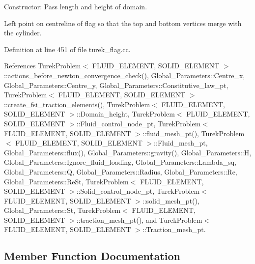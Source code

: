 Constructor\+: Pass length and height of domain. 

Left point on centreline of flag so that the top and bottom vertices merge with the cylinder. 

Definition at line 451 of file turek\+\_\+flag.\+cc.



References Turek\+Problem$<$ F\+L\+U\+I\+D\+\_\+\+E\+L\+E\+M\+E\+N\+T, S\+O\+L\+I\+D\+\_\+\+E\+L\+E\+M\+E\+N\+T $>$\+::actions\+\_\+before\+\_\+newton\+\_\+convergence\+\_\+check(), Global\+\_\+\+Parameters\+::\+Centre\+\_\+x, Global\+\_\+\+Parameters\+::\+Centre\+\_\+y, Global\+\_\+\+Parameters\+::\+Constitutive\+\_\+law\+\_\+pt, Turek\+Problem$<$ F\+L\+U\+I\+D\+\_\+\+E\+L\+E\+M\+E\+N\+T, S\+O\+L\+I\+D\+\_\+\+E\+L\+E\+M\+E\+N\+T $>$\+::create\+\_\+fsi\+\_\+traction\+\_\+elements(), Turek\+Problem$<$ F\+L\+U\+I\+D\+\_\+\+E\+L\+E\+M\+E\+N\+T, S\+O\+L\+I\+D\+\_\+\+E\+L\+E\+M\+E\+N\+T $>$\+::\+Domain\+\_\+height, Turek\+Problem$<$ F\+L\+U\+I\+D\+\_\+\+E\+L\+E\+M\+E\+N\+T, S\+O\+L\+I\+D\+\_\+\+E\+L\+E\+M\+E\+N\+T $>$\+::\+Fluid\+\_\+control\+\_\+node\+\_\+pt, Turek\+Problem$<$ F\+L\+U\+I\+D\+\_\+\+E\+L\+E\+M\+E\+N\+T, S\+O\+L\+I\+D\+\_\+\+E\+L\+E\+M\+E\+N\+T $>$\+::fluid\+\_\+mesh\+\_\+pt(), Turek\+Problem$<$ F\+L\+U\+I\+D\+\_\+\+E\+L\+E\+M\+E\+N\+T, S\+O\+L\+I\+D\+\_\+\+E\+L\+E\+M\+E\+N\+T $>$\+::\+Fluid\+\_\+mesh\+\_\+pt, Global\+\_\+\+Parameters\+::flux(), Global\+\_\+\+Parameters\+::gravity(), Global\+\_\+\+Parameters\+::H, Global\+\_\+\+Parameters\+::\+Ignore\+\_\+fluid\+\_\+loading, Global\+\_\+\+Parameters\+::\+Lambda\+\_\+sq, Global\+\_\+\+Parameters\+::Q, Global\+\_\+\+Parameters\+::\+Radius, Global\+\_\+\+Parameters\+::\+Re, Global\+\_\+\+Parameters\+::\+Re\+St, Turek\+Problem$<$ F\+L\+U\+I\+D\+\_\+\+E\+L\+E\+M\+E\+N\+T, S\+O\+L\+I\+D\+\_\+\+E\+L\+E\+M\+E\+N\+T $>$\+::\+Solid\+\_\+control\+\_\+node\+\_\+pt, Turek\+Problem$<$ F\+L\+U\+I\+D\+\_\+\+E\+L\+E\+M\+E\+N\+T, S\+O\+L\+I\+D\+\_\+\+E\+L\+E\+M\+E\+N\+T $>$\+::solid\+\_\+mesh\+\_\+pt(), Global\+\_\+\+Parameters\+::\+St, Turek\+Problem$<$ F\+L\+U\+I\+D\+\_\+\+E\+L\+E\+M\+E\+N\+T, S\+O\+L\+I\+D\+\_\+\+E\+L\+E\+M\+E\+N\+T $>$\+::traction\+\_\+mesh\+\_\+pt(), and Turek\+Problem$<$ F\+L\+U\+I\+D\+\_\+\+E\+L\+E\+M\+E\+N\+T, S\+O\+L\+I\+D\+\_\+\+E\+L\+E\+M\+E\+N\+T $>$\+::\+Traction\+\_\+mesh\+\_\+pt.



\subsection{Member Function Documentation}
\mbox{\label{classTurekProblem_a39df0332d7606a5befe89bb0e581184b}} 
